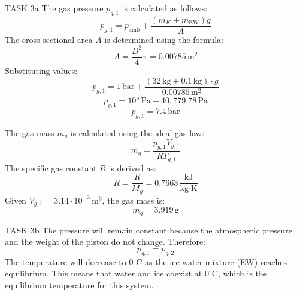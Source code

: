 TASK 3a  
The gas pressure \( p_{g,1} \) is calculated as follows:  
\[
p_{g,1} = p_{\text{amb}} + \frac{(m_K + m_{\text{EW}}) g}{A}
\]  
The cross-sectional area \( A \) is determined using the formula:  
\[
A = \frac{D^2}{4} \pi = 0.00785 \, \text{m}^2
\]  
Substituting values:  
\[
p_{g,1} = 1 \, \text{bar} + \frac{(32 \, \text{kg} + 0.1 \, \text{kg}) \cdot g}{0.00785 \, \text{m}^2}
\]  
\[
p_{g,1} = 10^5 \, \text{Pa} + 40,779.78 \, \text{Pa}
\]  
\[
p_{g,1} = 7.4 \, \text{bar}
\]  

The gas mass \( m_g \) is calculated using the ideal gas law:  
\[
m_g = \frac{p_{g,1} V_{g,1}}{R T_{g,1}}
\]  
The specific gas constant \( R \) is derived as:  
\[
R = \frac{R}{M_g} = 0.7663 \, \frac{\text{kJ}}{\text{kg·K}}
\]  
Given \( V_{g,1} = 3.14 \cdot 10^{-3} \, \text{m}^3 \), the gas mass is:  
\[
m_g = 3.919 \, \text{g}
\]  

TASK 3b  
The pressure will remain constant because the atmospheric pressure and the weight of the piston do not change. Therefore:  
\[
p_{g,1} = p_{g,2}
\]  
The temperature will decrease to \( 0^\circ\text{C} \) as the ice-water mixture (EW) reaches equilibrium. This means that water and ice coexist at \( 0^\circ\text{C} \), which is the equilibrium temperature for this system.